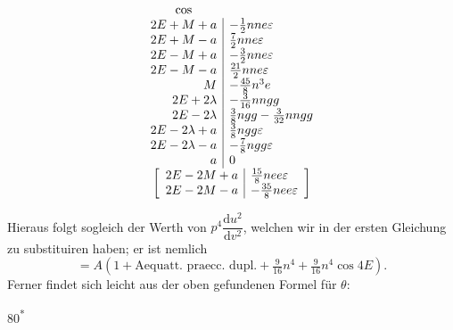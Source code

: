 \[
\begin{array}{r|l}
\multicolumn{1}{c}{\cos}&\\
2E+M+a&-\tfrac12nne\varepsilon\\
2E+M-a&\tfrac72nne\varepsilon\\
2E-M+a&-\tfrac32nne\varepsilon\\
2E-M-a&\tfrac{21}{2}nne\varepsilon\\
M&-\tfrac{45}{8}n^3e\\
2E+2\lambda&-\tfrac{3}{16}nngg\\
2E-2\lambda&\tfrac38ngg-\tfrac{3}{32}nngg\\
2E-2\lambda+a&\tfrac38ngg\varepsilon\\
2E-2\lambda-a&-\tfrac78ngg\varepsilon\\
a&0\\
\multicolumn{2}{c}{\left[\begin{array}{r|l}
2E-2M+a&\tfrac{15}{8}nee\varepsilon\\
2E-2M-a&-\tfrac{35}{8}nee\varepsilon
\end{array}\right]}
\end{array}
\]
\par\noindent\hspace*{\parindent}Hieraus folgt sogleich der Werth von \(p^4\dfrac{\mathrm du^2}{\mathrm dv^2}\), welchen wir in der ersten
Gleichung zu substituiren haben; er ist nemlich
\[
=A(1+\text{Aequatt. praecc. dupl.}+\tfrac{9}{16}n^4+\tfrac{9}{16}n^4\cos4E).
\]
\noindent Ferner findet sich leicht aus der oben gefundenen Formel für \(\theta\):\par
\vfill
\noindent\hfill80\textsuperscript{*}\par
\clearpage
\endgroup
